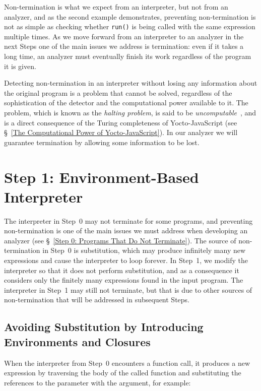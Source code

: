 \documentclass[12pt, oneside]{book}
\begin{document}
Non-termination is what we expect from an interpreter, but not from an analyzer, and as the second example demonstrates, preventing non-termination is not as simple as checking whether \texttt{run()} is being called with the same expression multiple times. As we move forward from an interpreter to an analyzer in the next Steps one of the main issues we address is termination: even if it takes a long time, an analyzer must eventually finish its work regardless of the program it is given.

\begin{mdframed}[frametitle = {Advanced}]
Detecting non-termination in an interpreter without losing any information about the original program is a problem that cannot be solved, regardless of the sophistication of the detector and the computational power available to it. The problem, which is known as the \emph{halting problem}, is said to be \emph{uncomputable}~\cite[§~8]{understanding-computation}, and is a direct consequence of the Turing completeness of Yocto-JavaScript (see §~\ref{The Computational Power of Yocto-JavaScript}). In our analyzer we will guarantee termination by allowing some information to be lost.
\end{mdframed}

\section{Step 1: Environment-Based Interpreter}

The interpreter in Step~0 may not terminate for some programs, and preventing non-termination is one of the main issues we must address when developing an analyzer (see §~\ref{Step 0: Programs That Do Not Terminate}). The source of non-termination in Step~0 is substitution, which may produce infinitely many new expressions and cause the interpreter to loop forever. In Step~1, we modify the interpreter so that it does not perform substitution, and as a consequence it considers only the finitely many expressions found in the input program. The interpreter in Step~1 may still not terminate, but that is due to other sources of non-termination that will be addressed in subsequent Steps.

\subsection{Avoiding Substitution by Introducing Environments and Closures}

When the interpreter from Step~0 encounters a function call, it produces a new expression by traversing the body of the called function and substituting the references to the parameter with the argument, for example:
\end{document}
